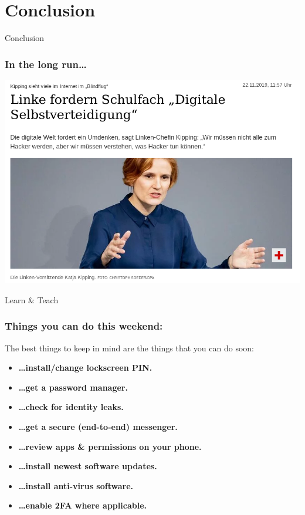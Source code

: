 \documentclass[aspectratio=1610,dvipsnames]{beamer}
\begin{document}


\section{Conclusion}
\begin{frame}
\begin{center}
\huge Conclusion
\end{center}
\end{frame}

\begin{frame}
\frametitle{In the long run\dots}
\begin{center}
\includegraphics[scale=0.25]{images/kipping.png}
\bigskip

\Large
Learn \& Teach
\end{center}
\end{frame}

\begin{frame}
\frametitle{Things you can do this weekend:}

The best things to keep in mind are the things that you can do soon:
\bigskip

\begin{itemize}
\pause\item\textbf{\dots install/change lockscreen PIN.}
\pause\item\textbf{\dots get a password manager.}
\pause\item\textbf{\dots check for identity leaks.}
\pause\item\textbf{\dots get a secure (end-to-end) messenger.}
\pause\item\textbf{\dots review apps \& permissions on your phone.}
\pause\item\textbf{\dots install newest software updates.}
\pause\item\textbf{\dots install anti-virus software.}\\
\pause\item\textbf{\dots enable 2FA where applicable.}
\end{itemize}
\end{frame}
\end{document}
